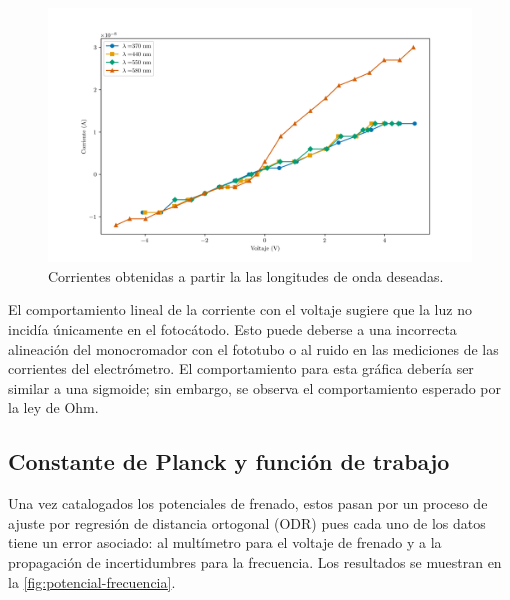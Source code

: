 \documentclass[12pt]{IEEEtran}
\begin{document}
\begin{figure}[htp]
    \centering
    \includegraphics[width=\linewidth, trim={0 0 0.5cm 0.5cm},clip]{figs/corriente-voltaje.png}
    \caption{Corrientes obtenidas a partir la las longitudes de onda deseadas.}
    \label{fig:corriente-voltaje}
\end{figure}

El comportamiento lineal de la corriente con el voltaje sugiere que la luz no incidía únicamente en el fotocátodo. Esto puede deberse a una incorrecta alineación del monocromador con el fototubo o al ruido en las mediciones de las corrientes del electrómetro. El comportamiento para esta gráfica debería ser similar a una sigmoide; sin embargo, se observa el comportamiento esperado por la ley de Ohm.

\subsection{Constante de Planck y función de trabajo}

Una vez catalogados los potenciales de frenado, estos pasan por un proceso de ajuste por regresión de distancia ortogonal (ODR)\cite{mastrandreaErrorAmbasVariables} pues cada uno de los datos tiene un error asociado: al multímetro para el voltaje de frenado y a la propagación de incertidumbres para la frecuencia. Los resultados se muestran en la \cref{fig:potencial-frecuencia}.
\end{document}
